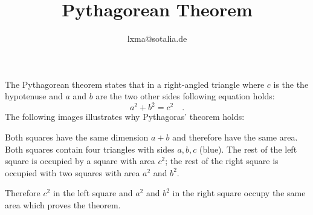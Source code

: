 \documentclass[a4paper,11pt]{article}
\begin{document}
    \title{Pythagorean Theorem}
    \author{lxma@sotalia.de}
    \maketitle\thispagestyle{empty}

    The Pythagorean theorem states that in a right-angled triangle where $c$ is
    the the hypotenuse and $a$ and $b$ are the two other sides following
    equation holds:
    \[
        a^2 + b^2 = c^2 \quad .
    \]
    The following images illustrates why Pythagoras' theorem holds:

    \begin{figure}[h]
        \centering
        
    \end{figure}

    Both squares have the same dimension $a+b$ and therefore have the same
    area. Both squares contain four triangles with sides $a,b,c$ (blue).
    The rest of the left square is occupied by a square with area $c^2$; the
    rest of the right square is occupied with two squares with area $a^2$ and
    $b^2$.

    Therefore $c^2$ in the left square and $a^2$ and $b^2$ in the right square
    occupy the same area which proves the theorem.
    
\end{document}
